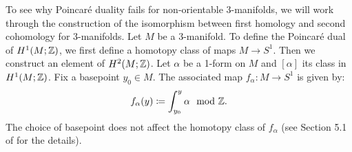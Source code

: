 To see why Poincar\'e duality fails for non-orientable 3-manifolds, we will work through the construction of the isomorphism between first homology and second cohomology for 3-manifolds.  Let $M$ be a 3-manifold.
To define the Poincar\'e dual of $H^1(M;\mathbb{Z})$, we first define a homotopy class of maps $M\rightarrow S^1$.  Then we construct an element of $H^2(M;\mathbb{Z})$.
Let $\alpha$ be a 1-form on $M$ and $[\alpha]$ its class in $H^1(M; \mathbb{Z})$.  Fix a basepoint $y_0\in M$.
The associated map $f_{\alpha}:M\rightarrow S^1$ is given by:
\begin{align}\label{form:map}
  f_{\alpha}(y) \coloneqq  \int_{y_0}^y \alpha \mod {\mathbb{Z}}.
\end{align}
The choice of basepoint does not affect the homotopy class of $f_\alpha$
(see Section 5.1 of \cite{calegari2007foliations} for the details).

